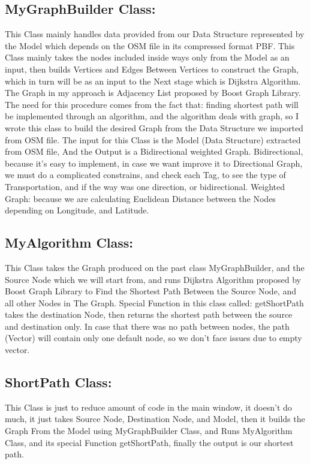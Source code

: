 \documentclass[a4paper,english]{book}
\begin{document}
\subsection{ MyGraphBuilder Class:}
This Class mainly handles data provided from our Data Structure represented by the Model which depends on the OSM file in its compressed format PBF.
This Class mainly takes the nodes included inside ways only from the
Model as an input, then builds Vertices and Edges Between Vertices to construct the Graph, which in turn will be as an input to the Next stage which is Dijkstra Algorithm.
The Graph in my approach is Adjacency List proposed by Boost Graph Library.
The need for this procedure comes from the fact that: finding shortest path will be implemented through an algorithm, and the algorithm deals with graph, so I wrote this class to build the desired Graph from the Data Structure we imported from OSM file.
The input for this Class is the Model (Data Structure) extracted from OSM file, 
And the Output is a Bidirectional weighted Graph.
Bidirectional, because it’s easy to implement, in case we want improve it to Directional Graph, we must do a complicated constrains, and check each Tag, to see the type of Transportation, and if the way was one direction, or bidirectional.
Weighted Graph: because we are calculating Euclidean Distance between the Nodes depending on Longitude, and Latitude.
\subsection{ MyAlgorithm Class:}
This Class takes the Graph produced on the past class MyGraphBuilder, and the Source Node which we will start from, and runs Dijkstra Algorithm proposed by Boost Graph Library to Find the Shortest Path Between the Source Node, and all other Nodes in The Graph.
Special Function in this class called: getShortPath takes the destination Node, then returns the shortest path between the source and destination only.
In case that there was no path between nodes, the path (Vector) will contain only one default node, so we don’t face issues due to empty vector.
\subsection{ ShortPath Class:}
This Class is just to reduce amount of code in the main window, it doesn’t do much, it just takes Source Node, Destination Node, and Model, then it builds the Graph From the Model using MyGraphBuilder Class, and Runs MyAlgorithm Class, and its special Function getShortPath, finally the output is our shortest path.
\end{document}
